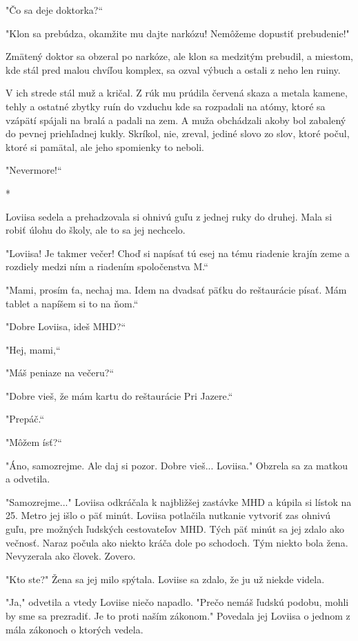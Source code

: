\documentclass{book}
\begin{document}
"Čo sa deje doktorka?“

"Klon sa prebúdza, okamžite mu dajte narkózu! Nemôžeme dopustiť prebudenie!"$ $ 

Zmätený doktor sa obzeral po narkóze, ale klon sa medzitým prebudil, a miestom, kde stál pred malou chvíľou komplex, sa ozval výbuch a ostali z neho len ruiny.

V ich strede stál muž a kričal. Z rúk mu prúdila červená skaza a metala kamene, tehly a ostatné zbytky ruín do vzduchu kde sa rozpadali na atómy, ktoré sa vzápätí spájali na bralá a padali na zem. A muža obchádzali akoby bol zabalený do pevnej priehľadnej kukly. Skríkol, nie, zreval, jediné slovo zo slov, ktoré počul, ktoré si pamätal, ale jeho spomienky to neboli.

"Nevermore!“

\begin{center}
*
\end{center}

Loviisa sedela a prehadzovala si ohnivú guľu z jednej ruky do druhej. Mala si robiť úlohu do školy, ale to sa jej nechcelo.

"Loviisa! Je takmer večer! Choď si napísať tú esej na tému riadenie krajín zeme a rozdiely medzi ním a riadením spoločenstva M.“

"Mami, prosím ťa, nechaj ma. Idem na dvadsať päťku do reštaurácie písať. Mám tablet a napíšem si to na ňom.“

"Dobre Loviisa, ideš MHD?“

"Hej, mami,“

"Máš peniaze na večeru?“

"Dobre vieš, že mám kartu do reštaurácie Pri Jazere.“

"Prepáč.“

"Môžem ísť?“

"Áno, samozrejme. Ale daj si pozor. Dobre vieš... Loviisa."$ $ Obzrela sa za matkou a odvetila.

"Samozrejme..."$ $ Loviisa odkráčala k najbližšej zastávke MHD a kúpila si lístok na 25. Metro jej išlo o päť minút. Loviisa potlačila nutkanie vytvoriť zas ohnivú guľu, pre možných ľudských cestovateľov MHD. Tých päť minút sa jej zdalo ako večnosť. Naraz počula ako niekto kráča dole po schodoch. Tým niekto bola žena. Nevyzerala ako človek. Zovero.

"Kto ste?"$ $ Žena sa jej milo spýtala. Loviise sa zdalo, že ju už niekde videla.

"Ja,"$ $ odvetila a vtedy Loviise niečo napadlo. "Prečo nemáš ľudskú podobu, mohli by sme sa prezradiť. Je to proti naším zákonom."$ $ Povedala jej Loviisa o jednom z mála zákonoch o ktorých vedela.
\end{document}
